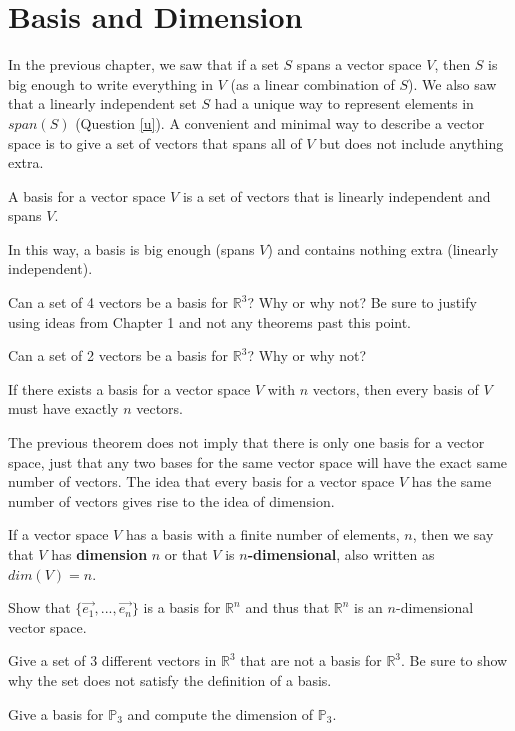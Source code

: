 \section{Basis and Dimension}
In the previous chapter, we saw that if a set $S$ spans a vector space $V$, then $S$ is big enough to write everything in $V$ (as a linear combination of $S$). We also saw that a linearly independent set $S$ had a unique way to represent elements in $span(S)$ (Question \ref{u}). A convenient and minimal way to describe a vector space is to give a set of vectors that spans all of $V$ but does not include anything extra.
\begin{definition} A basis for a vector space $V$ is a set of vectors that is linearly independent and spans $V$.
\end{definition}
In this way, a basis is big enough (spans $V$) and contains nothing extra (linearly independent).

\bq Can a set of 4 vectors be a basis for $\mathbb{R}^3$? Why or why not? Be sure to justify using ideas from Chapter 1 and not any theorems past this point.
\eq

\bq Can a set of 2 vectors be a basis for $\mathbb{R}^3$? Why or why not?
\eq

\begin{theorem}
If there exists a basis for a vector space $V$ with $n$ vectors, then every basis of $V$ must have exactly $n$ vectors.
\end{theorem}
The previous theorem does not imply that there is only one basis for a vector space, just that any two bases for the same vector space will have the exact same number of vectors. The idea that every basis for a vector space $V$ has the same number of vectors gives rise to the idea of dimension.
\begin{definition} If a vector space $V$ has a basis with a finite number of elements, $n$, then we say that $V$ has \textbf{dimension} $n$ or that $V$ is \textbf{$n$-dimensional}, also written as $dim(V)=n$. \end{definition}

\bq Show that $\{ \vec{e_1}, ... ,\vec{e_n} \}$ is a basis for $\mathbb{R}^n$ and thus that $\mathbb{R}^n$ is an $n$-dimensional vector space.
\eq

\bq Give a set of 3 different vectors in $\mathbb{R}^3$ that are not a basis for $\mathbb{R}^3$. Be sure to show why the set does not satisfy the definition of a basis.
\eq

\bq Give a basis for $\mathbb{P}_3$ and compute the dimension of $\mathbb{P}_3$.
\eq

